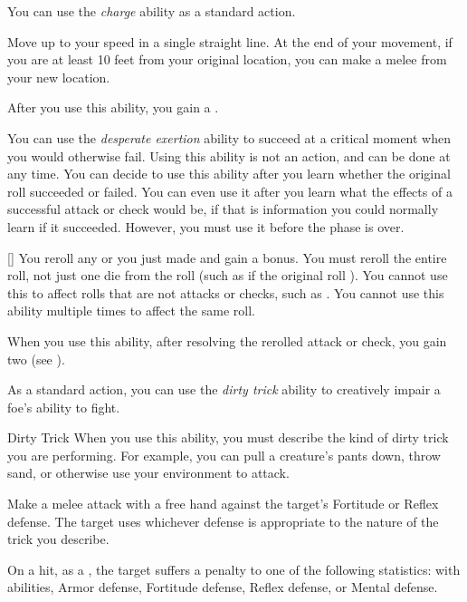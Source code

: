          You can use the \textit{charge} ability as a standard action.

        \begin{freeability}{}
            Move up to your speed in a single straight line.
            At the end of your movement, if you are at least 10 feet from your original location, you can make a melee  from your new location.

            After you use this ability, you gain a .
        \end{freeability}

         You can use the \textit{desperate exertion} ability to succeed at a critical moment when you would otherwise fail.
        Using this ability is not an action, and can be done at any time.
        You can decide to use this ability after you learn whether the original roll succeeded or failed.
        You can even use it after you learn what the effects of a successful attack or check would be, if that is information you could normally learn if it succeeded.
        However, you must use it before the phase is over.

        \begin{freeability}{}[]
            You reroll any  or  you just made and gain a  bonus.
            You must reroll the entire roll, not just one die from the roll (such as if the original roll ).
            You cannot use this to affect rolls that are not attacks or checks, such as .
            You cannot use this ability multiple times to affect the same roll.

            When you use this ability, after resolving the rerolled attack or check, you gain two  (see ).
        \end{freeability}

         As a standard action, you can use the \textit{dirty trick} ability to creatively impair a foe's ability to fight.

        \begin{freeability}{Dirty Trick}\label{Dirty Trick}
            When you use this ability, you must describe the kind of dirty trick you are performing.
            For example, you can pull a creature's pants down, throw sand, or otherwise use your environment to attack.

            Make a melee attack with a free hand against the target's Fortitude or Reflex defense.
            The target uses whichever defense is appropriate to the nature of the trick you describe.

            On a hit, as a , the target suffers a  penalty to one of the following statistics:
             with  abilities, Armor defense, Fortitude defense, Reflex defense, or Mental defense.
        \end{freeability}

